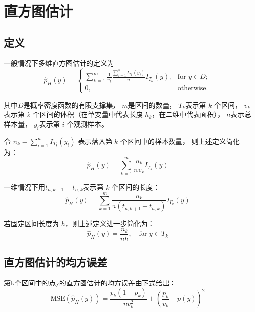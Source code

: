 \documentclass[UTF8]{ctexart}
\begin{document}
\pagestyle{fancy}
\fancyhead{}

\section{直方图估计}

\subsection{定义}

一般情况下多维直方图估计的定义为
\begin{equation}
\hat{p}_H(y) = 
\begin{cases} 
\sum_{k=1}^m \frac{1}{v_k} \frac{\sum_{i=1}^n I_{T_k}(y_i)}{n} I_{T_k}(y), & \text{for } y \in D; \\ 
0, & \text{otherwise}. 
\end{cases}
\end{equation}

其中$D$是概率密度函数的有限支撑集，
$m$是区间的数量，
$T_k$表示第 $k$ 个区间，
$v_k$表示第 $k$ 个区间的体积（在单变量中代表长度 $h_k$，在二维中代表面积），
$n$表示总样本量，
$y_i$表示第 $i$ 个观测样本。

令 $n_k = \sum_{i=1}^n I_{T_k}(y_i)$ 表示落入第 $k$ 个区间中的样本数量，
则上述定义简化为：
\begin{equation}
\hat{p}_H(y) = \sum_{k=1}^m \frac{n_k}{n v_k} I_{T_k}(y)
\end{equation}

一维情况下用$t_{n,k+1} - t_{n,k}$表示第 $k$ 个区间的长度：
\begin{equation}
\hat{p}_H(y) = \sum_{k=1}^m \frac{n_k}{n(t_{n,k+1} - t_{n,k})} I_{T_k}(y)
\end{equation}

若固定区间长度为 $h$，则上述定义进一步简化为：
\begin{equation}
\hat{p}_H(y) = \frac{n_k}{nh}, \quad \text{for } y \in T_k
\end{equation}

\subsection{直方图估计的均方误差}

第k个区间中的点y的直方图估计的均方误差由下式给出：
\begin{equation}
\text{MSE}(\hat{p}_H(y)) = \frac{p_k(1-p_k)}{nv_k^2} + \left( \frac{p_k}{v_k} - p(y) \right)^2
\end{equation}
\end{document}
